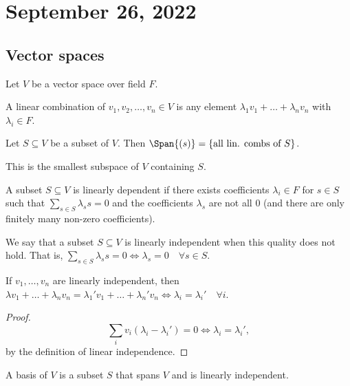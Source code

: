 \section{September 26, 2022}

\subsection{Vector spaces}

Let $V$ be a vector space over field $F$. 

\begin{definition}

A \ac{linear combination} of $v_1, v_2, \hdots, v_n\in V$ is any element $\lambda_1v_1+\hdots+\lambda_nv_n$ with $\lambda_i\in F$. 
\end{definition}

\begin{definition}

Let $S\subseteq V$ be a subset of $V$. Then $\Span{(s)} = \{\text{all lin. combs of }S\}$.
\end{definition}

This is the smallest subspace of $V$ containing $S$. 

\begin{definition}

A subset $S\subseteq V$ is \ac{linearly dependent} if there exists coefficients $\lambda_i\in F$ for $s\in S$ such that $\sum_{s\in S}\lambda_s s = 0$ and the coefficients $\lambda_s$ are not all $0$ (and there are only finitely many non-zero coefficients). 
\end{definition}

We say that a subset $S\subseteq V$ is linearly independent when this quality does not hold. That is, $\sum_{s\in S}\lambda_s s = 0\iff \lambda_s=0\quad \forall s\in S$. 

\begin{theorem}
\proplabel

If $v_1, \hdots, v_n$ are linearly independent, then $\lambda v_1+\hdots + \lambda_nv_n = \lambda_1'v_1+\hdots + \lambda_n'v_n\iff \lambda_i=\lambda_i'\quad \forall i$. 
\end{theorem}

\begin{proof}
\[\sum_{i}v_i(\lambda_i-\lambda_i') = 0\iff \lambda_i=\lambda_i',\]
by the definition of linear independence. 
\end{proof}

\begin{definition}

A \ac{basis} of $V$ is a subset $S$ that spans $V$ and is linearly independent. 
\end{definition}

